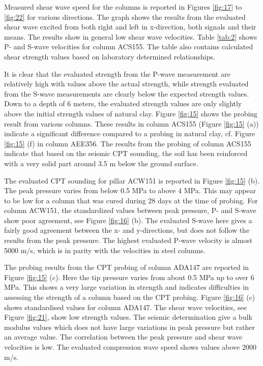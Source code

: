 \documentclass[final,3p,times,onecolumn,authoryear]{elsarticle}
\begin{document}
Measured shear wave speed for the columns is reported in Figures \ref{fig:17} to \ref{fig:22} for various directions. The graph shows the results from the evaluated shear wave excited from both right and left in x-direction, both signals and their means. The results show in general low shear wave velocities. Table \ref{tab:2} shows P- and S-wave velocities for column ACS155. The table also contains calculated shear strength values based on laboratory determined relationships.   
         
It is clear that the evaluated strength from the P-wave measurement are relatively high with values above the actual strength, while strength evaluated from the S-wave measurements are clearly below the expected strength values. Down to a depth of 6 meters, the evaluated strength values are only slightly above the initial strength values of natural clay. Figure \ref{fig:15} shows the probing result from various columns. These results in column ACS155 (Figure \ref{fig:15} (a)) indicate a significant difference compared to a probing in natural clay, cf. Figure \ref{fig:15} (f) in column AEE356. The results from the probing of column ACS155 indicate that based on the seismic CPT sounding, the soil has been reinforced with a very solid part around 3.5 m below the ground surface.

The evaluated CPT sounding for pillar ACW151 is reported in Figure \ref{fig:15} (b). The peak pressure varies from below 0.5 MPa to above 4 MPa. This may appear to be low for a column that was cured during 28 days at the time of probing. For column ACW151, the standardized values between peak pressure, P- and S-wave show poor agreement, see Figure \ref{fig:16} (b). The evaluated S-wave here gives a fairly good agreement between the x- and y-directions, but does not follow the results from the peak pressure. The highest evaluated P-wave velocity is almost 5000 m/s, which is in parity with the velocities in steel columns.

The probing results from the CPT probing of column ADA147 are reported in Figure \ref{fig:15} (c). Here the tip pressure varies from about 0.5 MPa up to over 6 MPa. This shows a very large variation in strength and indicates difficulties in assessing the strength of a column based on the CPT probing. Figure \ref{fig:16} (c) shows standardised values for column ADA147. The shear wave velocities, see Figure \ref{fig:21}, show low strength values. The seismic determination give a bulk modulus values which does not have large variations in peak pressure but rather an average value. The correlation between the peak pressure and shear wave velocities is low. The evaluated compression wave speed shows values above 2000 m/s.
\end{document}
